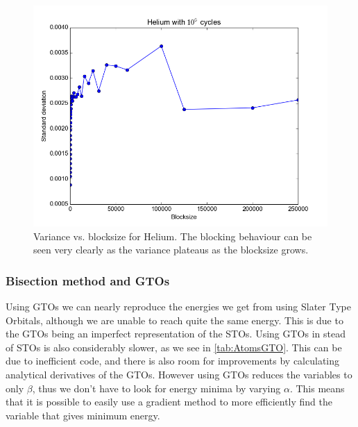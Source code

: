 			\begin{figure}
				\centering\includegraphics[width=0.45\linewidth]{../figures/Helium_blocking}
				\protect\caption{Variance vs. blocksize for Helium. The blocking behaviour can be seen very clearly as the variance plateaus as the blocksize grows.}
				\label{fig:HeliumBlocking}
			\end{figure}


		\subsubsection{Bisection method and GTOs}

		Using GTOs we can nearly reproduce the energies we get from using Slater Type Orbitals, although we are unable to reach quite the same energy. This is due to the GTOs being an imperfect representation of the STOs. Using GTOs in stead of STOs is also considerably slower, as we see in \ref{tab:AtomsGTO}. This can be due to inefficient code, and there is also room for improvements by calculating analytical derivatives of the GTOs. However using GTOs reduces the variables to only $\beta$, thus we don't have to look for energy minima by varying $\alpha$. This means that it is possible to easily use a gradient method to more efficiently find the variable that gives minimum energy.
